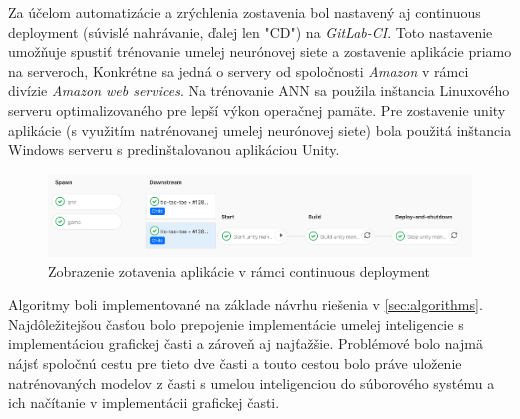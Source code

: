 Za účelom automatizácie a zrýchlenia zostavenia bol nastavený aj continuous deployment (súvislé nahrávanie, ďalej len
"CD") na \emph{GitLab-CI}.
Toto nastavenie umožňuje spustiť trénovanie umelej neurónovej siete a zostavenie aplikácie priamo na serveroch,
Konkrétne sa jedná o servery od spoločnosti \emph{Amazon} v rámci divízie \emph{Amazon web services}.
Na trénovanie ANN sa použila inštancia Linuxového serveru optimalizovaného pre lepší výkon operačnej pamäte.
Pre zostavenie unity aplikácie (s využitím natrénovanej umelej neurónovej siete) bola použitá inštancia Windows
serveru s predinštalovanou aplikáciou Unity.
\begin{figure}[H]
    \centering
    \includegraphics[width=1\textwidth]{images/impl-cd.png}
    \caption{Zobrazenie zotavenia aplikácie v rámci continuous deployment}
\end{figure}\label{figure:cd}

Algoritmy boli implementované na základe návrhu riešenia v \autoref{sec:algorithms}.
Najdôležitejšou časťou bolo prepojenie implementácie umelej inteligencie s implementáciou grafickej časti a zároveň aj
najťažšie.
Problémové bolo najmä nájsť spoločnú cestu pre tieto dve časti a touto cestou bolo práve uloženie natrénovaných modelov
z časti s umelou inteligenciou do súborového systému a ich načítanie v implementácii grafickej časti.
